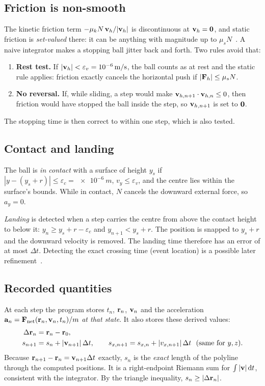 \documentclass[11pt]{article}
\begin{document}
\subsection{Friction is non-smooth}
The kinetic friction term $-\mu_k N\,\mathbf{v}_h/|\mathbf{v}_h|$ is discontinuous at $\mathbf{v}_h=\mathbf{0}$, and
static friction is \emph{set-valued} there: it can be anything with magnitude up to $\mu_s N$~\cite{stewart2000}.
A naive integrator makes a stopping ball jitter back and forth. Two rules avoid that:
\begin{enumerate}
  \item \textbf{Rest test.} If $|\mathbf{v}_h| < \varepsilon_v = \SI{e-6}{m/s}$, the ball counts as at rest and the
        static rule applies: friction exactly cancels the horizontal push if $|\mathbf{F}_h|\le\mu_s N$.
  \item \textbf{No reversal.} If, while sliding, a step would make $\mathbf{v}_{h,n+1}\cdot\mathbf{v}_{h,n} \le 0$, then
        friction would have stopped the ball inside the step, so $\mathbf{v}_{h,n+1}$ is set to $\mathbf{0}$.
\end{enumerate}
The stopping time is then correct to within one step, which is also tested.

\subsection{Contact and landing}
The ball is \emph{in contact} with a surface of height $y_s$ if
$|y - (y_s + r)| \le \varepsilon_c = \SI{e-6}{m}$, $v_y \le \varepsilon_v$, and the centre lies within the
surface's bounds. While in contact, $N$ cancels the downward external force, so $a_y = 0$.

\emph{Landing} is detected when a step carries the centre from above the contact height to
below it: $y_n \ge y_s + r - \varepsilon_c$ and $y_{n+1} < y_s + r$. The position is snapped to
$y_s + r$ and the downward velocity is removed. The landing time therefore has an error of at most
$\Delta t$. Detecting the exact crossing time (event location) is a possible later refinement~\cite{press2007}.

\subsection{Recorded quantities}
At each step the program stores $t_n$, $\mathbf{r}_n$, $\mathbf{v}_n$ and the acceleration $\mathbf{a}_n = \mathbf{F}_\text{net}(\mathbf{r}_n,\mathbf{v}_n,t_n)/m$
\emph{at that state}. It also stores these derived values:
\begin{align}
  \Delta\mathbf{r}_n &= \mathbf{r}_n - \mathbf{r}_0, \\
  s_{n+1} &= s_n + |\mathbf{v}_{n+1}|\,\Delta t, \qquad s_{x,n+1} = s_{x,n} + |v_{x,n+1}|\,\Delta t \ \ (\text{same for } y, z).
\end{align}
Because $\mathbf{r}_{n+1}-\mathbf{r}_n = \mathbf{v}_{n+1}\Delta t$ exactly, $s_n$ is the \emph{exact} length of the
polyline through the computed positions. It is a right-endpoint Riemann sum for
$\int |\mathbf{v}|\,\mathrm{d} t$, consistent with the integrator. By the triangle inequality,
$s_n \ge |\Delta\mathbf{r}_n|$.
\end{document}
